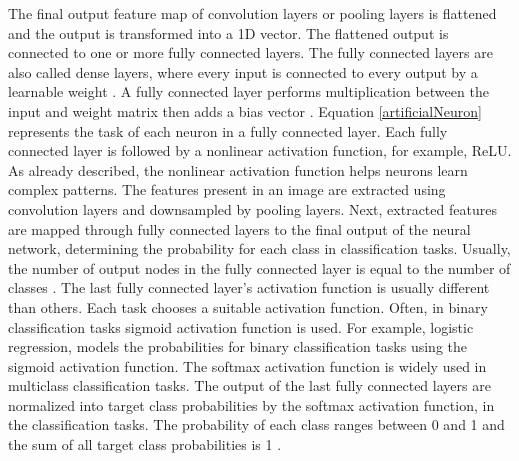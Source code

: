 The final output feature map of convolution layers or pooling layers is flattened and the output is transformed into a \ac{1D} vector. The flattened output is connected to one or more fully connected layers. The fully connected layers are also called dense layers, where every input is connected to every output by a learnable weight \cite{articleCNNs}. A fully connected layer performs multiplication between the input and weight matrix then adds a bias vector \cite{articleCNNs}. Equation \ref{artificialNeuron} represents the task of each neuron in a fully connected layer. Each fully connected layer is followed by a nonlinear activation function, for example, \ac{ReLU}. As already described, the nonlinear activation function helps neurons learn complex patterns. The features present in an image are extracted using convolution layers and downsampled by pooling layers. Next, extracted features are mapped through fully connected layers to the final output of the neural network, determining the probability for each class in classification tasks. Usually, the number of output nodes in the fully connected layer is equal to the number of classes \cite{articleCNNs}. The last fully connected layer's activation function is usually different than others. Each task chooses a suitable activation function. Often, in binary classification tasks sigmoid activation function is used. For example, logistic regression, models the probabilities for binary classification tasks using the sigmoid activation function\footnotemark. The softmax activation function is widely used in multiclass classification tasks. The output of the last fully connected layers are normalized into target class probabilities by the softmax activation function, in the classification tasks. The probability of each class ranges between 0 and 1 and the sum of all target class probabilities is 1 \cite{articleCNNs}.
































